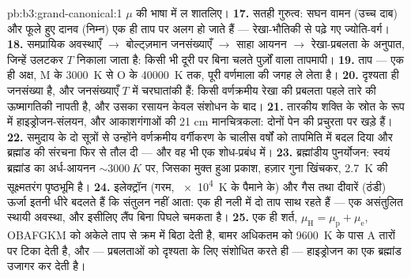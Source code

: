\begin{solution}{pb:b3:grand-canonical:1}
$\mu$ की भाषा में ल शातलिए।
\textbf{17.} सतही गुरुत्व: सघन वामन (उच्च दाब) और फूले हुए दानव
(निम्न) एक ही ताप पर अलग हो जाते हैं --- रेखा-भौतिकी से पढ़े गए
ज्योति-वर्ग।
\textbf{18.} समप्रायिक अवस्थाएँ $\to$ बोल्ट्ज़मान जनसंख्याएँ
$\to$ साहा आयनन $\to$ रेखा-प्रबलता के अनुपात, जिन्हें उलटकर
$T$ निकाला जाता है: किसी भी दूरी पर बिना चलते पुर्ज़ों वाला तापमापी।
\textbf{19.} ताप --- एक ही अक्ष, M के \qty{3000}{K} से
O के \qty{40000}{K} तक, पूरी वर्णमाला की जगह ले लेता है।
\textbf{20.} दृश्यता ही जनसंख्या है, और जनसंख्याएँ $T$ में
चरघातांकी हैं: किसी वर्णक्रमीय रेखा की प्रबलता पहले तारे की
ऊष्मागतिकी नापती है, और उसका रसायन केवल संशोधन के बाद।
\textbf{21.} तारकीय शक्ति के स्रोत के रूप में हाइड्रोजन-संलयन, और
आकाशगंगाओं की 21 cm मानचित्रकला: दोनों पेन की प्रचुरता पर खड़े हैं।
\textbf{22.} समुदाय के दो सूत्रों से उन्होंने वर्णक्रमीय वर्गीकरण
के चालीस वर्षों को तापमिति में बदल दिया और ब्रह्मांड की संरचना फिर
से तौल दी --- और वह भी एक शोध-प्रबंध में।
\textbf{23.} ब्रह्मांडीय पुनर्योजन: स्वयं ब्रह्मांड का
अर्ध-आयनन $\sim\qty{3000}{K}$ पर, जिसका मुक्त हुआ प्रकाश,
हज़ार गुना खिंचकर, \qty{2.7}{K} की सूक्ष्मतरंग
पृष्ठभूमि है।
\textbf{24.} इलेक्ट्रॉन (गरम, \qty{e4}{K} के पैमाने के) और गैस
तथा दीवारें (ठंडी) ऊर्जा इतनी धीरे बदलते हैं कि संतुलन नहीं आता: एक
ही नली में दो ताप साथ रहते हैं --- एक असंतुलित स्थायी अवस्था, और
इसीलिए लैंप बिना पिघले चमकता है।
\textbf{25.} एक ही शर्त, $\mu_{\text{H}} = \mu_{\text{p}} +
\mu_{\text{e}}$, OBAFGKM को अकेले ताप से क्रम में बिठा देती है,
बामर अधिकतम को \qty{9600}{K} के पास A तारों पर टिका देती है, और
--- प्रबलताओं को दृश्यता के लिए संशोधित करते ही --- हाइड्रोजन का
एक ब्रह्मांड उजागर कर देती है।
\end{solution}
